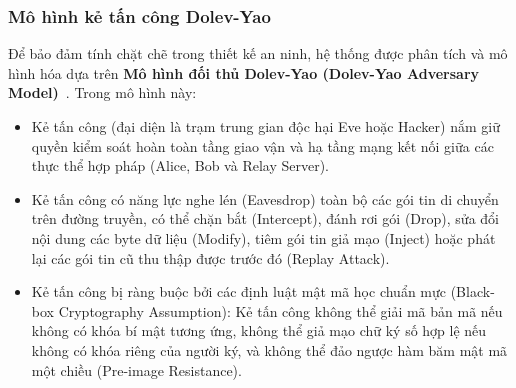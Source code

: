 \documentclass[a4paper,12pt]{article}
\begin{document}
\subsubsection{Mô hình kẻ tấn công Dolev-Yao}
Để bảo đảm tính chặt chẽ trong thiết kế an ninh, hệ thống được phân tích và mô hình hóa dựa trên \textbf{Mô hình đối thủ Dolev-Yao (Dolev-Yao Adversary Model)}~\cite{dolev_yao}. Trong mô hình này:
\begin{itemize}
    \item Kẻ tấn công (đại diện là trạm trung gian độc hại Eve hoặc Hacker) nắm giữ quyền kiểm soát hoàn toàn tầng giao vận và hạ tầng mạng kết nối giữa các thực thể hợp pháp (Alice, Bob và Relay Server).
    \item Kẻ tấn công có năng lực nghe lén (Eavesdrop) toàn bộ các gói tin di chuyển trên đường truyền, có thể chặn bắt (Intercept), đánh rơi gói (Drop), sửa đổi nội dung các byte dữ liệu (Modify), tiêm gói tin giả mạo (Inject) hoặc phát lại các gói tin cũ thu thập được trước đó (Replay Attack).
    \item Kẻ tấn công bị ràng buộc bởi các định luật mật mã học chuẩn mực (Black-box Cryptography Assumption): Kẻ tấn công không thể giải mã bản mã nếu không có khóa bí mật tương ứng, không thể giả mạo chữ ký số hợp lệ nếu không có khóa riêng của người ký, và không thể đảo ngược hàm băm mật mã một chiều (Pre-image Resistance).
\end{itemize}
\end{document}
